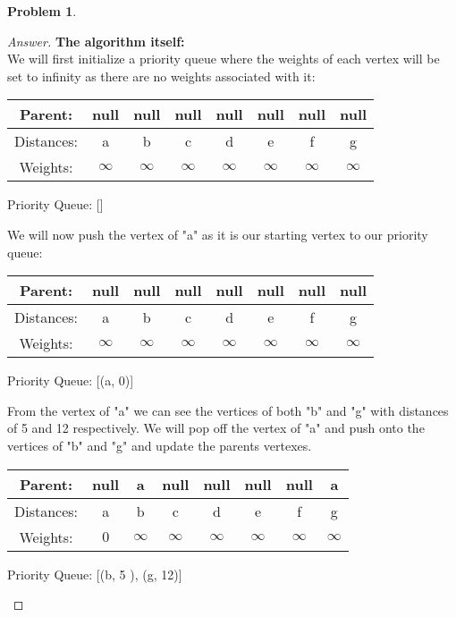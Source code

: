 \documentclass[11pt]{article}
\theoremstyle{definition}
\theoremstyle{definition}
\newtheorem{required}{Problem}
\theoremstyle{definition}
\begin{document}
\begin{required}
\begin{proof}[Answer]
\textbf{The algorithm itself:}\\
We will first initialize a priority queue where the weights of each vertex will be set to infinity as there are no weights associated with it: \\
\begin{center}
\begin{tabular}{ | c | c | c | c | c | c | c | c | }
 \hline
 Parent:& null & null & null & null & null & null & null\\ 
 \hline
 Distances:& a & b & c & d & e & f & g\\  
 \hline
 Weights: & $\infty$ & $\infty$ & $\infty$ & $\infty$ & $\infty$ & $\infty$ &$\infty$\\
  \hline
\end{tabular}
\end{center}
\begin{center}
Priority Queue: []
\end{center}

We will now push the vertex of "a" as it is our starting vertex to our priority queue:  \\
\begin{center}
\begin{tabular}{ | c | c | c | c | c | c | c | c | }
 \hline
 Parent:& null & null & null & null & null & null & null\\ 
 \hline
 Distances:& a & b & c & d & e & f & g\\  
 \hline
 Weights: & $\infty$ & $\infty$ & $\infty$ & $\infty$ & $\infty$ & $\infty$ &$\infty$\\
  \hline
\end{tabular}
\end{center}
\begin{center}
Priority Queue: [(a, 0)]
\end{center}

From the vertex of "a" we can see the vertices of both "b" and "g" with distances of 5 and 12 respectively. We will pop off the vertex of "a" and push onto the vertices of "b" and "g" and update the parents vertexes.  \\
\begin{center}
\begin{tabular}{ | c | c | c | c | c | c | c | c | }
 \hline
 Parent:& null & a & null & null & null & null & a\\ 
 \hline
 Distances:& a & b & c & d & e & f & g\\  
 \hline
 Weights: & $0$ & $\infty$ & $\infty$ & $\infty$ & $\infty$ & $\infty$ &$\infty$\\
  \hline
\end{tabular}
\end{center}
\begin{center}
Priority Queue: [(b, 5 ), (g, 12)]
\end{center}


\end{proof}
\end{required}
\end{document}
